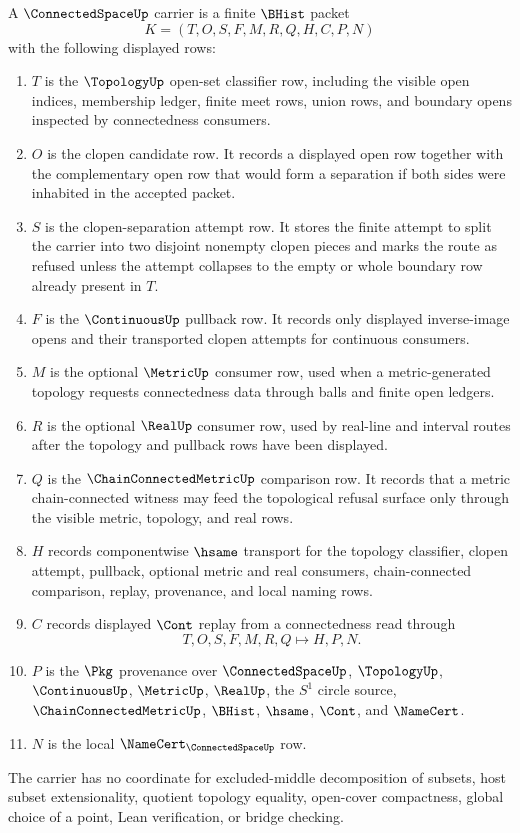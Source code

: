 \begin{definition}
\label{def:connected-space-carrier}
A $\ConnectedSpaceUp$ carrier is a finite $\BHist$ packet
$$
K=(T,O,S,F,M,R,Q,H,C,P,N)
$$
with the following displayed rows:
\begin{enumerate}
\item $T$ is the $\TopologyUp$ open-set classifier row, including the visible open indices, membership ledger, finite meet rows, union rows, and boundary opens inspected by connectedness consumers.
\item $O$ is the clopen candidate row. It records a displayed open row together with the complementary open row that would form a separation if both sides were inhabited in the accepted packet.
\item $S$ is the clopen-separation attempt row. It stores the finite attempt to split the carrier into two disjoint nonempty clopen pieces and marks the route as refused unless the attempt collapses to the empty or whole boundary row already present in $T$.
\item $F$ is the $\ContinuousUp$ pullback row. It records only displayed inverse-image opens and their transported clopen attempts for continuous consumers.
\item $M$ is the optional $\MetricUp$ consumer row, used when a metric-generated topology requests connectedness data through balls and finite open ledgers.
\item $R$ is the optional $\RealUp$ consumer row, used by real-line and interval routes after the topology and pullback rows have been displayed.
\item $Q$ is the $\ChainConnectedMetricUp$ comparison row. It records that a metric chain-connected witness may feed the topological refusal surface only through the visible metric, topology, and real rows.
\item $H$ records componentwise $\hsame$ transport for the topology classifier, clopen attempt, pullback, optional metric and real consumers, chain-connected comparison, replay, provenance, and local naming rows.
\item $C$ records displayed $\Cont$ replay from a connectedness read through
$$
T,O,S,F,M,R,Q \longmapsto H,P,N .
$$
\item $P$ is the $\Pkg$ provenance over $\ConnectedSpaceUp$, $\TopologyUp$, $\ContinuousUp$, $\MetricUp$, $\RealUp$, the $S^1$ circle source, $\ChainConnectedMetricUp$, $\BHist$, $\hsame$, $\Cont$, and $\NameCert$.
\item $N$ is the local $\NameCert_{\ConnectedSpaceUp}$ row.
\end{enumerate}
The carrier has no coordinate for excluded-middle decomposition of subsets, host subset extensionality, quotient topology equality, open-cover compactness, global choice of a point, Lean verification, or bridge checking.
\end{definition}

